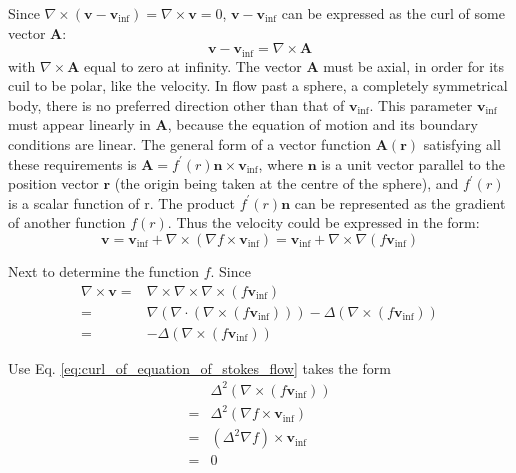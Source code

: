 \documentclass[conference]{IEEEtran}
\theoremstyle{definition}
\theoremstyle{remark}
\begin{document}
    Since $\nabla \times (\mathbf{v} - \mathbf{v}_{\mathrm{inf}}) = \nabla \times \mathbf{v} = 0$, $\mathbf{v} - \mathbf{v}_{\mathrm{inf}}$ can be expressed as the curl of some vector $\mathbf{A}$:
    \begin{equation*}
        \mathbf{v} - \mathbf{v}_{\mathrm{inf}} = \nabla \times \mathbf{A}
    \end{equation*}
    with $\nabla \times \mathbf{A}$ equal to zero at infinity. The vector $\mathbf{A}$ must be axial, in order for its cuil to be polar, like the velocity. In flow past a sphere, a completely symmetrical body, there is no preferred direction other than that of $\mathbf{v}_{\mathrm{inf}}$. This parameter $\mathbf{v}_{\mathrm{inf}}$ must appear linearly in $\mathbf{A}$, because the equation of motion and its boundary conditions are linear. The general form of a vector function $\mathbf{A}(\mathbf{r})$ satisfying all these requirements is $\mathbf{A} = f^\prime (r) \mathbf{n} \times \mathbf{v}_{\mathrm{inf}}$, where $\mathbf{n}$ is a unit vector parallel to the position vector $\mathbf{r}$ (the origin being taken at the centre of the sphere), and $f^\prime(r)$ is a scalar function of r. The product $f^\prime(r) \mathbf{n}$ can be represented as the gradient of another function $f(r)$. Thus the velocity could be expressed in the form:
    \begin{equation}
        \mathbf{v} = \mathbf{v}_{\mathrm{inf}} + \nabla \times (\nabla f \times \mathbf{v}_\mathrm{inf}) = \mathbf{v}_{\mathrm{inf}} + \nabla \times \nabla (f \mathbf{v}_{\mathrm{inf}})
        \label{eq:velocity_in_f}
    \end{equation}

    Next to determine the function $f$. Since
    \begin{align*}
        \nabla \times \mathbf{v} =& \nabla \times \nabla \times \nabla \times (f \mathbf{v}_{\mathrm{inf}}) \\
        =& \nabla\left( \nabla \cdot \left( \nabla \times (f\mathbf{v}_\mathrm{inf}) \right) \right) - \Delta (\nabla \times (f \mathbf{v}_\mathrm{inf})) \\
        =& -\Delta (\nabla \times (f\mathbf{v}_\mathrm{inf}))
    \end{align*}

    Use Eq. \ref{eq:curl_of_equation_of_stokes_flow} takes the form
    \begin{align*}
        &\Delta^2 (\nabla \times (f\mathbf{v}_\mathrm{inf})) \\
        =& \Delta^2 (\nabla f \times \mathbf{v}_\mathrm{inf}) \\
        =& (\Delta^2 \nabla f) \times \mathbf{v}_\mathrm{inf} \\
        =& 0
    \end{align*}
\end{document}
